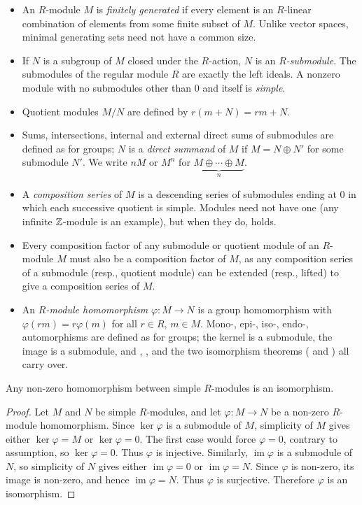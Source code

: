 \documentclass[../Odyssey_Project.tex]{subfiles}
\begin{document}
\begin{itemize}
    \item An $R$-module $M$ is \emph{finitely generated} if every element is an $R$-linear combination of elements from some finite subset of $M$. Unlike vector spaces, minimal generating sets need not have a common size.
    \item If $N$ is a subgroup of $M$ closed under the $R$-action, $N$ is an \emph{$R$-submodule}. The submodules of the regular module $R$ are exactly the left ideals. A nonzero module with no submodules other than $0$ and itself is \emph{simple}.
    \item Quotient modules $M/N$ are defined by $r(m + N) = rm + N$.
    \item Sums, intersections, internal and external direct sums of submodules are defined as for groups; $N$ is a \emph{direct summand} of $M$ if $M = N \oplus N'$ for some submodule $N'$. We write $nM$ or $M^n$ for $\underbrace{M \oplus \cdots \oplus M}_{n}$.
    \item A \emph{composition series} of $M$ is a descending series of submodules ending at $0$ in which each successive quotient is simple. Modules need not have one (any infinite $\mathbb{Z}$-module is an example), but when they do,  holds.
    \item Every composition factor of any submodule or quotient module of an $R$-module $M$ must also be a composition factor of $M$, as any composition series of a submodule (resp., quotient module) can be extended (resp., lifted) to give a composition series of $M$.
    \item An \emph{$R$-module homomorphism} $\varphi \colon M \to N$ is a group homomorphism with $\varphi(rm) = r\varphi(m)$ for all $r \in R$, $m \in M$. Mono-, epi-, iso-, endo-, automorphisms are defined as for groups; the kernel is a submodule, the image is a submodule, and , , and the two isomorphism theorems ( and ) all carry over.
\end{itemize}

\begin{namedlemma}
\label{lem:schur}
Any non-zero homomorphism between simple $R$-modules is an isomorphism.
\end{namedlemma}
\begin{proof}
    Let $M$ and $N$ be simple $R$-modules, and let $\varphi \colon M \to N$ be a non-zero $R$-module homomorphism. Since $\ker \varphi$ is a submodule of $M$, simplicity of $M$ gives either $\ker \varphi = M$ or $\ker \varphi = 0$. The first case would force $\varphi = 0$, contrary to assumption, so $\ker \varphi = 0$. Thus $\varphi$ is injective. Similarly, $\operatorname{im}\varphi$ is a submodule of $N$, so simplicity of $N$ gives either $\operatorname{im}\varphi = 0$ or $\operatorname{im}\varphi = N$. Since $\varphi$ is non-zero, its image is non-zero, and hence $\operatorname{im}\varphi = N$. Thus $\varphi$ is surjective. Therefore $\varphi$ is an isomorphism.
\end{proof}
\end{document}
